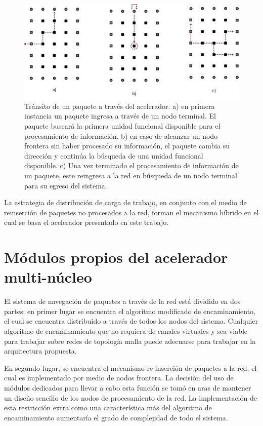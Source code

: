 \begin{figure}
	\begin{center}
		\includegraphics[scale=0.7]{figures/ch5_transmision_paquete.png}
	\end{center}
	\caption
		{	
			Tránsito de un paquete a través del acelerador. a) en primera instancia un paquete ingresa a través de un nodo terminal. El paquete buscará la primera unidad funcional disponible para el procesamiento de información. b) en caso de alcanzar un nodo frontera sin haber procesado su información, el paquete cambia su dirección y continúa la búsqueda de una unidad funcional disponible. c) Una vez terminado el procesamiento de información de un paquete, este reingresa a la red en búsqueda de un nodo terminal para su egreso del sistema.
		}
	\label{fig:ch5_transmision_paquete}
\end{figure}

La estrategia de distribución de carga de trabajo, en conjunto con el medio de reinserción de paquetes no procesados a la red, forman el mecanismo híbrido en el cual se basa el acelerador presentado en este trabajo.


\section{Módulos propios del acelerador multi-núcleo}
	\label{sec:ch5_modulos_propios_del_acelerador}

El sistema de navegación de paquetes a través de la red está dividido en dos partes: en primer lugar se encuentra el algoritmo modificado de encaminamiento, el cual se encuentra distribuido a través de todos los nodos del sistema. Cualquier algoritmo de encaminamiento que no requiera de canales virtuales y sea viable para trabajar sobre redes de topología malla puede adecuarse para trabajar en la arquitectura propuesta.

En segundo lugar, se encuentra el mecanismo re inserción de paquetes a la red, el cual es implementado por medio de nodos frontera. La decisión del uso de módulos dedicados para llevar a cabo esta función se tomó en aras de mantener un diseño sencillo de los nodos de procesamiento de la red. La implementación de esta restricción extra como una característica más del algoritmo de encaminamiento aumentaría el grado de complejidad de todo el sistema.

